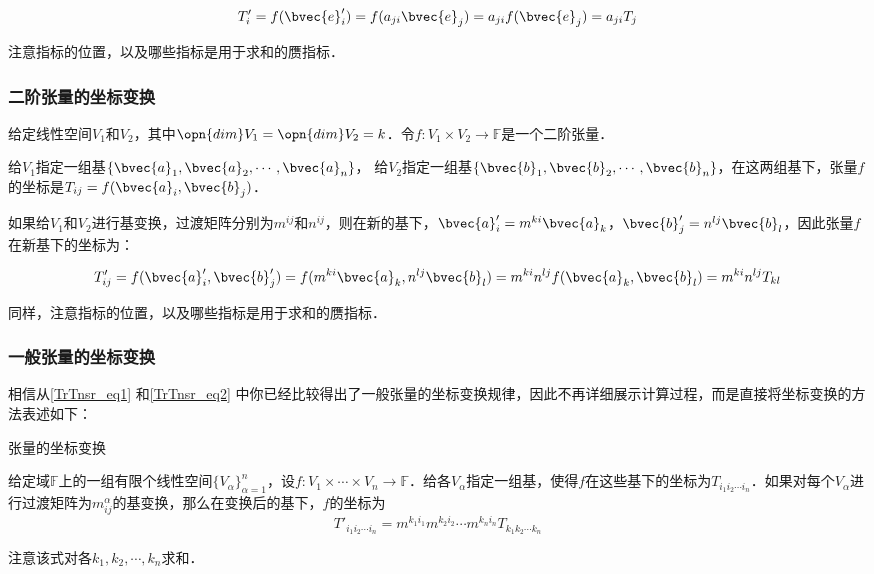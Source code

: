 \begin{equation}\label{TrTnsr_eq1}
T'_{i}=f(\bvec{e}'_i)=f(a_{ji}\bvec{e}_j)=a_{ji}f(\bvec{e}_j)=a_{ji}T_{j}
\end{equation}

注意指标的位置，以及哪些指标是用于求和的赝指标．

\subsubsection{二阶张量的坐标变换}

给定线性空间$V_1$和$V_2$，其中$\opn{dim}V_1=\opn{dim}V_2=k$．令$f:V_1\times V_2\rightarrow\mathbb{F}$是一个二阶张量．

给$V_1$指定一组基$\{\bvec{a}_1, \bvec{a}_2, \cdots, \bvec{a}_n\}$， 给$V_2$指定一组基$\{\bvec{b}_1, \bvec{b}_2, \cdots, \bvec{b}_n\}$，在这两组基下，张量$f$的坐标是$T_{ij}=f(\bvec{a}_i, \bvec{b}_j)$．

如果给$V_1$和$V_2$进行基变换，过渡矩阵分别为$m^{ij}$和$n^{ij}$，则在新的基下，$\bvec{a}'_i=m^{ki}\bvec{a}_k$，$\bvec{b}'_j=n^{lj}\bvec{b}_l$，因此张量$f$在新基下的坐标为：

\begin{equation}\label{TrTnsr_eq2}
T'_{ij}=f(\bvec{a}'_i, \bvec{b}'_j)=f(m^{ki}\bvec{a}_k, n^{lj}\bvec{b}_l)=m^{ki}n^{lj}f(\bvec{a}_k, \bvec{b}_l)=m^{ki}n^{lj}T_{kl}
\end{equation}

同样，注意指标的位置，以及哪些指标是用于求和的赝指标．

\subsubsection{一般张量的坐标变换}

相信从\autoref{TrTnsr_eq1} 和\autoref{TrTnsr_eq2} 中你已经比较得出了一般张量的坐标变换规律，因此不再详细展示计算过程，而是直接将坐标变换的方法表述如下：

\begin{theorem}{张量的坐标变换}

给定域$\mathbb{F}$上的一组有限个线性空间$\{V_\alpha\}^n_{\alpha=1}$，设$f:V_1\times\cdots\times V_n\rightarrow\mathbb{F}$．给各$V_\alpha$指定一组基，使得$f$在这些基下的坐标为$T_{i_1i_2\cdots i_n}$．如果对每个$V_\alpha$进行过渡矩阵为$m^\alpha_{ij}$的基变换，那么在变换后的基下，$f$的坐标为
\begin{equation}
T'_{i_1i_2\cdots i_n}=m^{k_1i_1}m^{k_2i_2}\cdots m^{k_ni_n}T_{k_1k_2\cdots k_n}
\end{equation}

注意该式对各$k_1, k_2, \cdots, k_n$求和．
\end{theorem}







